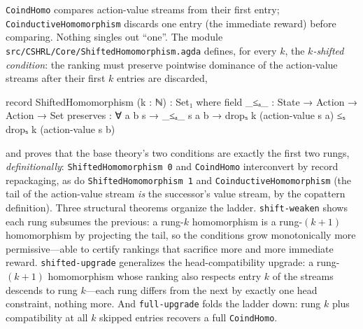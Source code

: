 \documentclass[9pt,a4paper]{article}
\newcommand{\fpath}[1]{\nolinkurl{#1}}
\theoremstyle{plain}
\theoremstyle{definition}
\theoremstyle{remark}
\begin{document}
\texttt{CoindHomo} compares action-value streams from their first entry; \texttt{CoinductiveHomomorphism} discards one entry (the immediate reward) before comparing.  Nothing singles out ``one''.  The module \fpath{src/CSHRL/Core/ShiftedHomomorphism.agda} defines, for every $k$, the \emph{$k$-shifted condition}: the ranking must preserve pointwise dominance of the action-value streams after their first $k$ entries are discarded,
\begin{spec}
record ShiftedHomomorphism (k : ℕ) : Set₁ where
  field
    _≤ₐ_      : State → Action → Action → Set
    preserves : ∀ a b s → _≤ₐ_ s a b →
                dropₛ k (action-value s a) ≤ₛ dropₛ k (action-value s b)
\end{spec}
and proves that the base theory's two conditions are exactly the first two rungs, \emph{definitionally}: \texttt{ShiftedHomomorphism 0} and \texttt{CoindHomo} interconvert by record repackaging, as do \texttt{ShiftedHomomorphism 1} and \texttt{CoinductiveHomomorphism} (the tail of the action-value stream \emph{is} the successor's value stream, by the copattern definition).  Three structural theorems organize the ladder.  \texttt{shift-weaken} shows each rung subsumes the previous: a rung-$k$ homomorphism is a rung-$(k{+}1)$ homomorphism by projecting the tail, so the conditions grow monotonically more permissive---able to certify rankings that sacrifice more and more immediate reward.  \texttt{shifted-upgrade} generalizes the head-compatibility upgrade: a rung-$(k{+}1)$ homomorphism whose ranking also respects entry $k$ of the streams descends to rung $k$---each rung differs from the next by exactly one head constraint, nothing more.  And \texttt{full-upgrade} folds the ladder down: rung $k$ plus compatibility at all $k$ skipped entries recovers a full \texttt{CoindHomo}.
\end{document}

